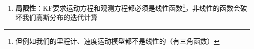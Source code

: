 \documentclass[../main.tex]{subfiles}
\begin{document}
\begin{enumerate}
{{\begin{enumerate}
  其中
  \begin{flushleft}
  $ \boldsymbol{\mu}_t = \bar{\boldsymbol{\mu}}_t + \mathbf{K}_t\big(\mathbf{z}_t - \mathbf{C}_t\bar{\boldsymbol{\mu}}_t\big)$\\
  $ \boldsymbol{\Sigma}_t = \big[\mathbf{I} - \mathbf{K}_t\mathbf{C}_t\big]\ \bar{\boldsymbol{\Sigma}}_t$
  \end{flushleft}
    其中
  $$\mathbf{K}_t = \bar{\boldsymbol{\Sigma}}_t\mathbf{C}_t^\top\big(\mathbf{C}_t\bar{\boldsymbol{\Sigma}}_t\mathbf{C}_t^\top + \mathbf{Q}_t\big)^{-1}$$
    称为新信息矩阵\footnote{可以看到$\mathbf{K}_t$如果乘上$\mathbf{C}_t$后，如果$\mathbf{Q}_t$比较小，那么$\mathbf{K}_t\mathbf{C}_t$就趋近于单位阵$\mathbf{I}$，那么$\mathbf{I}-\mathbf{K}_t\mathbf{C}_t$就变小了，显然$\mathbf{\Sigma}_t$就变小了}
\end{enumerate}
}}
    \item \textbf{局限性}：KF要求运动方程和观测方程都必须是线性函数\footnote{但例如我们的里程计、速度运动模型都不是线性的（有三角函数）}，非线性的函数会破坏我们高斯分布的迭代计算

        
\end{enumerate}
\end{document}
